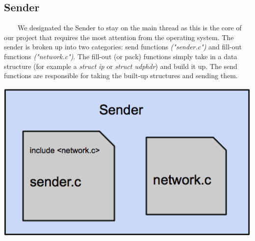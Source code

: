 \documentclass[11pt]{article}
\begin{document}
\subsection{Sender}
\ \ \ \ We designated the Sender to stay on the main thread as this is the core of our project that requires the most attention from the operating system. The sender is broken up into two categories: send functions \textit{("sender.c")} and fill-out functions \textit{("network.c")}. The fill-out (or pack) functions simply take in a data structure (for example a \textit{struct ip} or \textit{struct udphdr}) and build it up. The send functions are responsible for taking the built-up structures and sending them.
\begin{center}
\includegraphics[scale=0.3]{images/sender-design.png}
\end{center}
\end{document}
